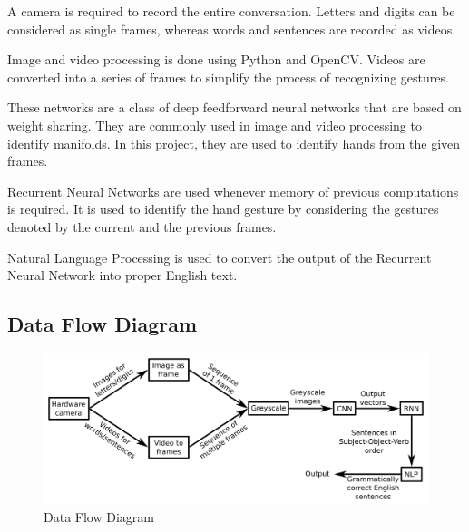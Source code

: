 \documentclass[12pt,oneside,a4paper]{article}
\begin{document}
			\begin{description}[style=nextline]

				\item[Input module] A camera is required to record the entire conversation. Letters and digits can be considered as single frames, whereas words and sentences are recorded as videos.

				\item[Image and Video Processing] Image and video processing is done using Python and OpenCV. Videos are converted into a series of frames to simplify the process of recognizing gestures.

				\item[Convolutional Neural Network] These networks are a class of deep feedforward neural networks that are based on weight sharing. They are commonly used in image and video processing to identify manifolds. In this project, they are used to identify hands from the given frames.

				\item[Recurrent Neural Network] Recurrent Neural Networks are used whenever memory of previous computations is required. It is used to identify the hand gesture by considering the gestures denoted by the current and the previous frames.

				\item[Natural Language Processing] Natural Language Processing is used to convert the output of the Recurrent Neural Network into proper English text.

			\end{description}

		\subsection{Data Flow Diagram}

			\begin{figure}[htp]
				\centering
				\includegraphics{dfd.png}
				\caption{Data Flow Diagram}
				\label{fig:dfd}
			\end{figure}
\end{document}
